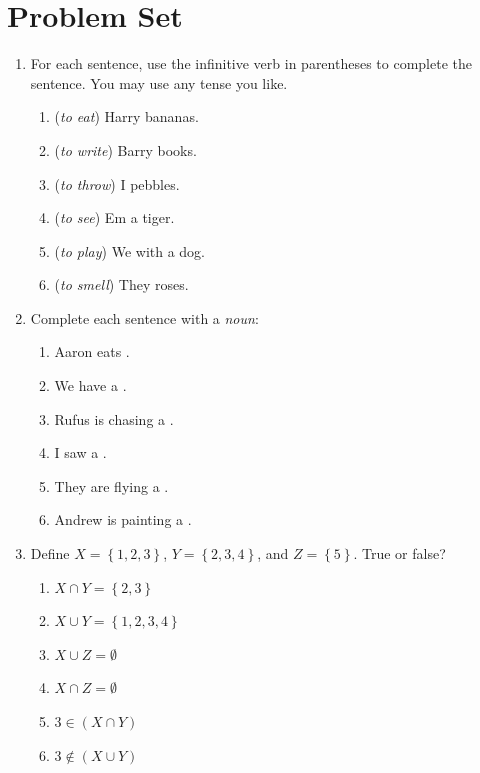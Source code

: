 \documentclass{tufte-book}
\begin{document}
\clearpage\section{Problem Set }

\begin{enumerate}
  \item For each sentence, use the infinitive verb in parentheses to complete the sentence. You may use any tense you like.
  \begin{enumerate}\bigskip
    \item (\textit{to eat}) Harry \dotfill bananas.\bigskip
    \item (\textit{to write}) Barry \dotfill books.\bigskip
    \item (\textit{to throw}) I \dotfill pebbles.\bigskip
    \item (\textit{to see}) Em \dotfill a tiger.\bigskip
    \item (\textit{to play}) We \dotfill with a dog.\bigskip
    \item (\textit{to smell}) They \dotfill roses.
  \end{enumerate}

  \item Complete each sentence with a \emph{noun}:
  \begin{enumerate}\bigskip
    \item Aaron eats \dotfill.\bigskip
    \item We have a \dotfill.\bigskip
    \item Rufus is chasing a \dotfill.\bigskip
    \item I saw a \dotfill.\bigskip
    \item They are flying a \dotfill.\bigskip
    \item Andrew is painting a \dotfill.\bigskip
  \end{enumerate}

  \item Define $X = \left\{1, 2, 3\right\}$, $Y = \left\{2, 3, 4\right\}$, and $Z = \left\{5\right\}$. True or false?
  \begin{multicols}{2}
  \begin{enumerate}
    \item $X \cap Y = \left\{2, 3\right\}$ \dotfill\bigskip
    \item $X \cup Y = \left\{1, 2, 3, 4\right\}$ \dotfill\bigskip
    \item $X \cup Z = \emptyset$\dotfill
    \item $X \cap Z = \emptyset$\dotfill\bigskip
    \item $3 \in \left(X \cap Y\right)$ \dotfill\bigskip
    \item $3 \notin \left(X \cup Y\right)$ \dotfill
  \end{enumerate}
  \end{multicols}
\end{enumerate}
\end{document}
